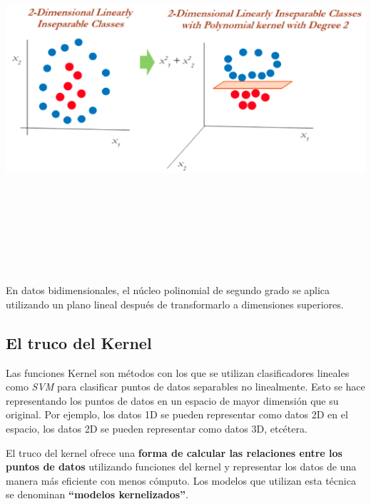 \documentclass[
]{book}
\begin{document}
\begin{center}\includegraphics[width=900pt,height=380pt]{img/03-svm/05_kernel_polinomial_plot2} \end{center}

En datos bidimensionales, el núcleo polinomial de segundo grado se aplica utilizando un plano lineal después de transformarlo a dimensiones superiores.

\hypertarget{el-truco-del-kernel}{%
\subsection{El truco del Kernel}\label{el-truco-del-kernel}}

Las funciones Kernel son métodos con los que se utilizan clasificadores lineales como \emph{SVM} para clasificar puntos de datos separables no linealmente. Esto se hace representando los puntos de datos en un espacio de mayor dimensión que su original. Por ejemplo, los datos 1D se pueden representar como datos 2D en el espacio, los datos 2D se pueden representar como datos 3D, etcétera.

El truco del kernel ofrece una \textbf{forma de calcular las relaciones entre los puntos de datos} utilizando funciones del kernel y representar los datos de una manera más eficiente con menos cómputo. Los modelos que utilizan esta técnica se denominan \textbf{``modelos kernelizados''}.
\end{document}
